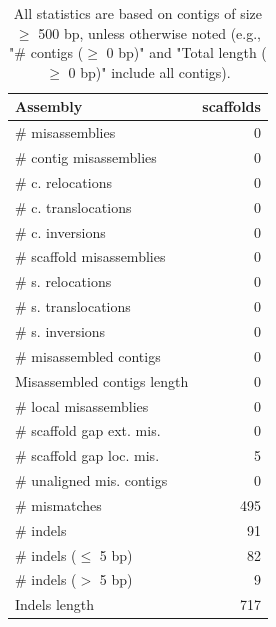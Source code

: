 \documentclass[12pt,a4paper]{article}
\begin{document}
\begin{table}[ht]
\begin{center}
\caption{All statistics are based on contigs of size $\geq$ 500 bp, unless otherwise noted (e.g., "\# contigs ($\geq$ 0 bp)" and "Total length ($\geq$ 0 bp)" include all contigs).}
\begin{tabular}{|l*{1}{|r}|}
\hline
Assembly & scaffolds \\ \hline
\# misassemblies & 0 \\ \hline
\hspace{2mm}\# contig misassemblies & 0 \\ \hline
\hspace{5mm}\# c. relocations & 0 \\ \hline
\hspace{5mm}\# c. translocations & 0 \\ \hline
\hspace{5mm}\# c. inversions & 0 \\ \hline
\hspace{2mm}\# scaffold misassemblies & 0 \\ \hline
\hspace{5mm}\# s. relocations & 0 \\ \hline
\hspace{5mm}\# s. translocations & 0 \\ \hline
\hspace{5mm}\# s. inversions & 0 \\ \hline
\# misassembled contigs & 0 \\ \hline
Misassembled contigs length & 0 \\ \hline
\# local misassemblies & 0 \\ \hline
\# scaffold gap ext. mis. & 0 \\ \hline
\# scaffold gap loc. mis. & 5 \\ \hline
\# unaligned mis. contigs & 0 \\ \hline
\# mismatches & 495 \\ \hline
\# indels & 91 \\ \hline
\hspace{5mm}\# indels ($\leq$ 5 bp) & 82 \\ \hline
\hspace{5mm}\# indels ($>$ 5 bp) & 9 \\ \hline
Indels length & 717 \\ \hline
\end{tabular}
\end{center}
\end{table}
\end{document}

